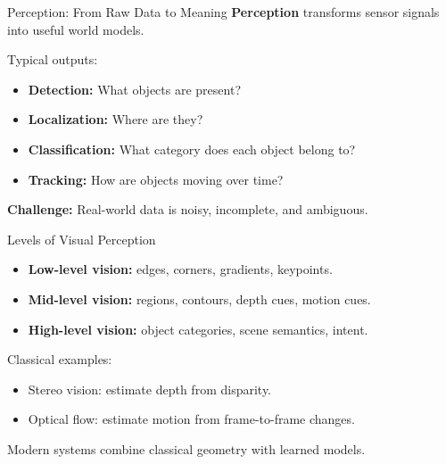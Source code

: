\documentclass[10pt]{beamer}
\begin{document}
\begin{frame}{Perception: From Raw Data to Meaning}
    \textbf{Perception} transforms sensor signals into useful world models.

    \vspace{0.2cm}
    Typical outputs:
    \begin{itemize}
        \item \textbf{Detection:} What objects are present?
        \item \textbf{Localization:} Where are they?
        \item \textbf{Classification:} What category does each object belong to?
        \item \textbf{Tracking:} How are objects moving over time?
    \end{itemize}

    \vspace{0.2cm}
    \textbf{Challenge:} Real-world data is noisy, incomplete, and ambiguous.
\end{frame}

\begin{frame}{Levels of Visual Perception}
    \begin{itemize}
        \item \textbf{Low-level vision:} edges, corners, gradients, keypoints.
        \item \textbf{Mid-level vision:} regions, contours, depth cues, motion cues.
        \item \textbf{High-level vision:} object categories, scene semantics, intent.
    \end{itemize}

    \vspace{0.2cm}
    Classical examples:
    \begin{itemize}
        \item Stereo vision: estimate depth from disparity.
        \item Optical flow: estimate motion from frame-to-frame changes.
    \end{itemize}

    \vspace{0.2cm}
    Modern systems combine classical geometry with learned models.
\end{frame}
\end{document}
